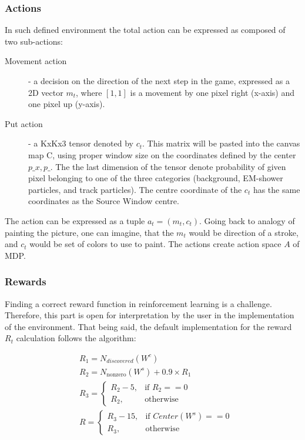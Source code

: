 \subsubsection{Actions}
\label{sec:rl_action}

In such defined environment the total action can be expressed as composed of two sub-actions:

\begin{description}
\item[Movement action] - a decision on the direction of the next step in the game, expressed as a 2D vector $m_{t}$, where $[1,1]$ is a movement by one pixel right (x-axis) and one pixel up (y-axis).

\item[Put action] - a KxKx3 tensor denoted by $c_{t}$. This matrix will be pasted into the canvas map C, using proper window size on the coordinates defined by the center $p\_x,p\_$.
The the last dimension of the tensor denote probability of given pixel belonging to one of the three categories (background, EM-shower particles, and track particles).
The centre coordinate of the $c_{t}$ has the same coordinates as the Source Window centre.


\end{description}

The action can be expressed as a tuple $a_{t} = (m_{t}, c_{t})$.
Going back to analogy of painting the picture, one can imagine, that the $m_{t}$ would be direction of a stroke, and $c_{t}$ would be set of colors to use to paint. 
The actions create action space $A$ of MDP.

\subsubsection{Rewards}

Finding a correct reward function in reinforcement learning is a challenge.
Therefore, this part is open for interpretation by the user in the implementation of the environment.
That being said, the default implementation for the reward $R_{t}$ calculation follows the algorithm:

\begin{align}
& R_{1} = N_{discovered}(W^{c}) \\
& R_{2}= N_{\mathrm{nonzero}}(W^{s}) + 0.9 \times R_{1}\\
& R_{3} =
\begin{cases}
    R_{2}-5,& \text{if } R_{2}== 0\\
    R_{2},              & \text{otherwise}
\end{cases} \\
& R =
\begin{cases}
    R_{3}-15,& \text{if } Center(W^{s}) == 0\\
    R_{3},              & \text{otherwise}
\end{cases}
\label{eq:reward}
\end{align}

